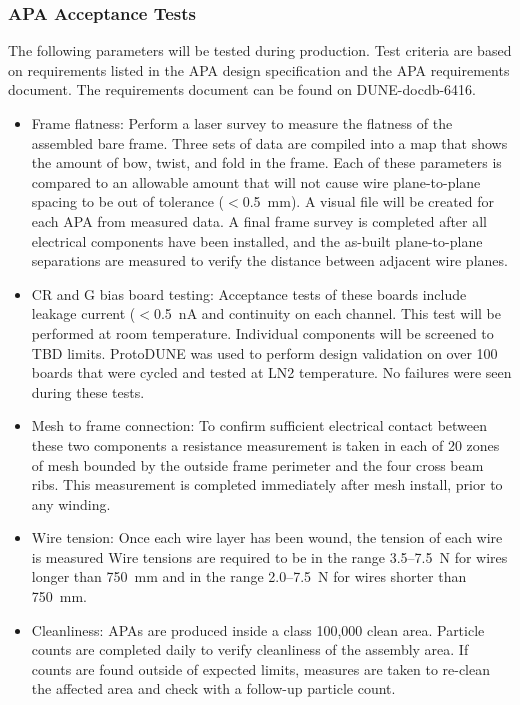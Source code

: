 \subsubsection{APA Acceptance Tests} 

The following parameters will be tested during production. Test criteria are based on requirements listed in the APA design specification and the APA requirements document. The requirements document can be found on DUNE-docdb-6416. 

\begin{itemize}
\item Frame flatness: Perform a laser survey to measure the flatness of the assembled bare frame. Three sets of data are compiled into a map that shows the amount of bow, twist, and fold in the frame. Each of these parameters is compared to an allowable amount that will not cause wire plane-to-plane spacing to be out of tolerance ($<$\SI{0.5}{mm}).  A visual file will be created for each APA from measured data. A final frame survey is completed after all electrical components have been installed, and the as-built plane-to-plane separations are measured to verify the distance between adjacent wire planes.

\item CR and G bias board testing: Acceptance tests of these boards include leakage current ($<$\SI{0.5}{nA} and continuity on each channel.  This test will be performed at room temperature. Individual components will be screened to TBD limits. ProtoDUNE was used to perform design validation on over 100 boards that were cycled and tested at LN2 temperature. No failures were seen during these tests. 

\item Mesh to frame connection: To confirm sufficient electrical contact between these two components a resistance measurement is taken in each of 20 zones of mesh bounded by the outside frame perimeter and the four cross beam ribs. This measurement is completed immediately after mesh install, prior to any winding.

\item Wire tension: Once each wire layer has been wound, the tension of each wire is measured 
Wire tensions are required to be in the range 3.5--\SI{7.5}{N} for wires longer than \SI{750}{mm} and in the range 2.0--\SI{7.5}{N} for wires shorter than \SI{750}{mm}.

\item Cleanliness: APAs are produced inside a class 100,000 clean area.  Particle counts are completed daily to verify cleanliness of the assembly area.  If counts are found outside of expected limits, measures are taken to re-clean the affected area and check with a follow-up particle count.
\end{itemize}


